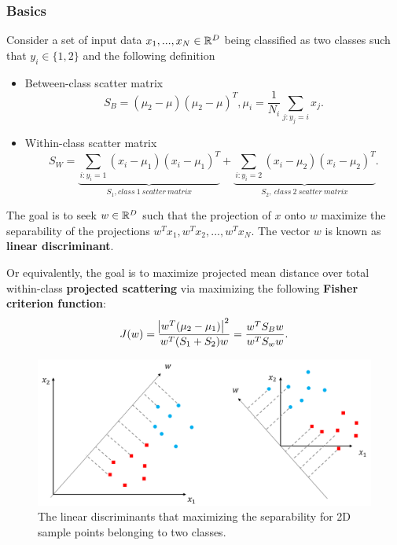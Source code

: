 \begin{refsection}
\subsubsection{Basics}
\begin{definition}
Consider a set of input data $x_1,...,x_N\in \mathbb{R}^D$ being classified as two classes such that $y_i\in \{1,2\}$ and the following definition	
\begin{itemize}
	\item Between-class scatter matrix
	$$S_B = (\mu_2 - \mu)(\mu_2-\mu)^T, \mu_i = \frac{1}{N_i}\sum_{j:y_j=i} x_j.$$
	\item Within-class scatter matrix
	$$S_W = \underbrace{\sum_{i:y_i=1} (x_i - \mu_1)(x_i - \mu_1)^T}_{S_1,  class~1~scatter~matrix} + \underbrace{\sum_{i:y_i=2} (x_i - \mu_2)(x_i - \mu_2)^T}_{S_2, ~class~2~scatter~matrix}.$$
\end{itemize}


The goal is to seek $w\in \mathbb{R}^D$ such that the projection of $x$ onto $w$ maximize the separability of the projections $w^Tx_1, w^Tx_2,..., w^Tx_N$. The vector $w$ is known as \textbf{linear discriminant}. 

Or equivalently, the goal is to maximize projected mean distance over total within-class \textbf{projected scattering} via maximizing the following \textbf{Fisher criterion function}:
	$$J(w) = \frac{\abs{w^T(\mu_2-\mu_1)}^2}{w^T(S_1+S_2)w} =\frac{w^TS_Bw}{w^TS_ww}.$$
\end{definition}


\begin{figure}[H]
	\centering
	\includegraphics[width=0.8\linewidth]{../figures/statisticalLearning/linearModelClassification/linearDiscriminateVectorDemo}
	\caption{The linear discriminants that maximizing the separability for 2D sample points belonging to two classes. }
	\label{fig:lineardiscriminatevectordemo}
\end{figure}



\end{refsection}
